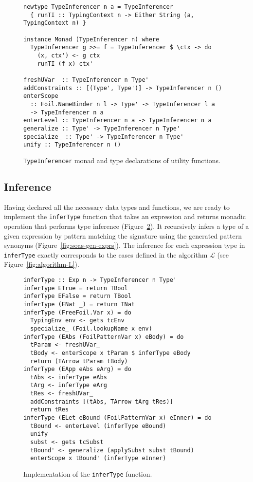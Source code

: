 \begin{figure}[H]
\begin{verbatim}
newtype TypeInferencer n a = TypeInferencer
  { runTI :: TypingContext n -> Either String (a, TypingContext n) }

instance Monad (TypeInferencer n) where
  TypeInferencer g >>= f = TypeInferencer $ \ctx -> do
    (x, ctx') <- g ctx
    runTI (f x) ctx'

freshUVar_ :: TypeInferencer n Type'
addConstraints :: [(Type', Type')] -> TypeInferencer n ()
enterScope
  :: Foil.NameBinder n l -> Type' -> TypeInferencer l a
  -> TypeInferencer n a
enterLevel :: TypeInferencer n a -> TypeInferencer n a
generalize :: Type' -> TypeInferencer n Type'
specialize_ :: Type' -> TypeInferencer n Type'
unify :: TypeInferencer n ()
\end{verbatim}
  \caption[\texttt{TypeInferencer} monad]{\texttt{TypeInferencer} monad and type declarations of utility functions.}
  \label{fig:TypeInferencer}
\end{figure}  

\subsection{Inference}

Having declared all the necessary data types and functions, we are ready to implement the \texttt{inferType} function that takes an expression and returns monadic operation that performs type inference (Figure~\ref{fig:inferType}). It recursively infers a type of a given expression by pattern matching the signature using the generated pattern synonyms (Figure~\ref{fig:soas-gen-exprs}). The inference for each expression type in \texttt{inferType} exactly corresponds to the cases defined in the algorithm $\mathcal{L}$ (see Figure~\ref{fig:algorithm-L}).

\begin{figure}[H]
  \begin{verbatim}
inferType :: Exp n -> TypeInferencer n Type'
inferType ETrue = return TBool
inferType EFalse = return TBool
inferType (ENat _) = return TNat
inferType (FreeFoil.Var x) = do
  TypingEnv env <- gets tcEnv
  specialize_ (Foil.lookupName x env)  
inferType (EAbs (FoilPatternVar x) eBody) = do
  tParam <- freshUVar_
  tBody <- enterScope x tParam $ inferType eBody
  return (TArrow tParam tBody)
inferType (EApp eAbs eArg) = do
  tAbs <- inferType eAbs
  tArg <- inferType eArg
  tRes <- freshUVar_
  addConstraints [(tAbs, TArrow tArg tRes)]
  return tRes
inferType (ELet eBound (FoilPatternVar x) eInner) = do
  tBound <- enterLevel (inferType eBound)
  unify
  subst <- gets tcSubst
  tBound' <- generalize (applySubst subst tBound)
  enterScope x tBound' (inferType eInner)
\end{verbatim}
  \caption[Implementation of \texttt{inferType}]{Implementation of the \texttt{inferType} function.}
  \label{fig:inferType}
\end{figure}

